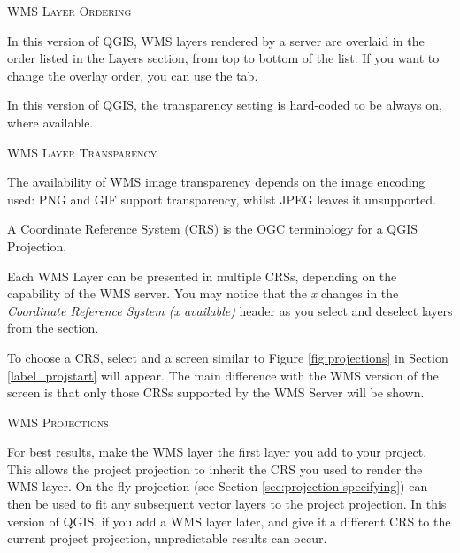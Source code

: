 \begin{Tip}[ht]\caption{\textsc{WMS Layer Ordering}}
In this version of QGIS, WMS layers rendered by a server are overlaid
in the order listed in the Layers section, from top to bottom of the list.
If you want to change the overlay order, you can use the  tab.
\end{Tip}

\label{ogc-wms-transparency}

In this version of QGIS, the transparency setting is hard-coded to
be always on, where available.

\begin{Tip}[ht]\caption{\textsc{WMS Layer Transparency}}
The availability of WMS image transparency depends on
the image encoding used:  PNG and GIF support transparency,
whilst JPEG leaves it unsupported.
\end{Tip}


A Coordinate Reference System (CRS) is the OGC terminology for a QGIS Projection.

Each WMS Layer can be presented in multiple CRSs, depending
on the capability of the WMS server.  You may notice that the \textsl{x} changes in
the \textsl{Coordinate Reference System (x available)} header as you
select and deselect layers from the  section.

To choose a CRS, select  and a screen similar to
Figure \ref{fig:projections} in Section \ref{label_projstart} will appear.
The main difference with the WMS version of the screen is that only
those CRSs supported by the WMS Server will be shown.


\begin{Tip}[ht]\caption{\textsc{WMS Projections}}
For best results, make the WMS layer the first layer
you add to your project.  This allows the project
projection to inherit the CRS you used to render the WMS layer.
On-the-fly projection (see Section \ref{sec:projection-specifying})
can then be used to fit any subsequent
vector layers to the project projection.
In this version of QGIS, if you add a WMS layer later, and give it a different
CRS to the current project projection, unpredictable
results can occur.
\end{Tip}

